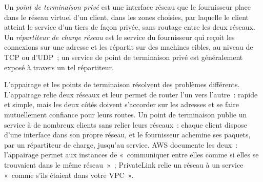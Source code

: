 \begin{definition}\label{def:nw:private-connectivity-to-crypto-venues:endpoint}
Un \emph{point de terminaison privé} est une interface réseau que le fournisseur place dans le réseau virtuel d'un client, dans les zones choisies,
par laquelle le client atteint le service d'un tiers de façon privée, sans routage entre les deux réseaux. Un \emph{répartiteur de
charge réseau} est le service du fournisseur qui reçoit les connexions sur une adresse et les répartit sur des machines cibles,
au niveau de TCP ou d'UDP~; un service de point de terminaison privé est généralement exposé à travers un tel répartiteur.
\end{definition}

L'appairage et les points de terminaison résolvent des problèmes différents. L'appairage relie deux réseaux et leur permet de router l'un vers l'autre~: rapide et simple, mais les deux côtés doivent
s'accorder sur les adresses et se faire mutuellement confiance pour leurs routes. Un point de terminaison publie un service à de nombreux clients sans relier leurs réseaux~: chaque
client dispose d'une interface dans son propre réseau, et le fournisseur achemine ses paquets, par un répartiteur de charge, jusqu'au service. AWS documente
les deux~: l'appairage permet aux instances de «~communiquer entre elles comme si elles se trouvaient dans le même réseau~»~; PrivateLink relie un réseau à un
service «~comme s'ils étaient dans votre VPC~».

